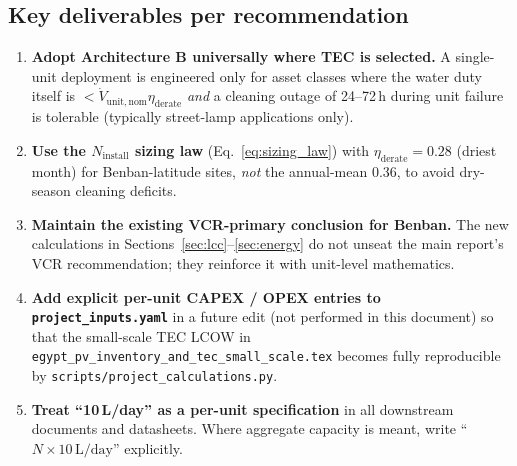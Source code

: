 \documentclass[11pt,a4paper]{article}
\newcommand{\SI}[2]{#1\,\ensuremath{\mathrm{#2}}}
\providecommand{\day}{day}
\providecommand{\liter}{L}
\begin{document}
\subsection{Key deliverables per recommendation}
\begin{enumerate}[leftmargin=*]
  \item \textbf{Adopt Architecture B universally where TEC is selected.} A single-unit deployment is engineered only for asset classes where the water duty itself is $<\dot{V}_{\mathrm{unit,nom}}\eta_{\mathrm{derate}}$ \emph{and} a cleaning outage of 24--72\,h during unit failure is tolerable (typically street-lamp applications only).
  \item \textbf{Use the $N_{\mathrm{install}}$ sizing law} (Eq.~\ref{eq:sizing_law}) with $\eta_{\mathrm{derate}}{=}0.28$ (driest month) for Benban-latitude sites, \emph{not} the annual-mean 0.36, to avoid dry-season cleaning deficits.
  \item \textbf{Maintain the existing VCR-primary conclusion for Benban.} The new calculations in Sections~\ref{sec:lcc}--\ref{sec:energy} do not unseat the main report's VCR recommendation; they reinforce it with unit-level mathematics.
  \item \textbf{Add explicit per-unit CAPEX / OPEX entries to \texttt{project\_inputs.yaml}} in a future edit (not performed in this document) so that the small-scale TEC LCOW in \texttt{egypt\_pv\_inventory\_and\_tec\_small\_scale.tex} becomes fully reproducible by \texttt{scripts/project\_calculations.py}.
  \item \textbf{Treat ``10\,L/day'' as a per-unit specification} in all downstream documents and datasheets. Where aggregate capacity is meant, write ``$N{\times}\SI{10}{\liter/\day}$'' explicitly.
\end{enumerate}

\end{document}
